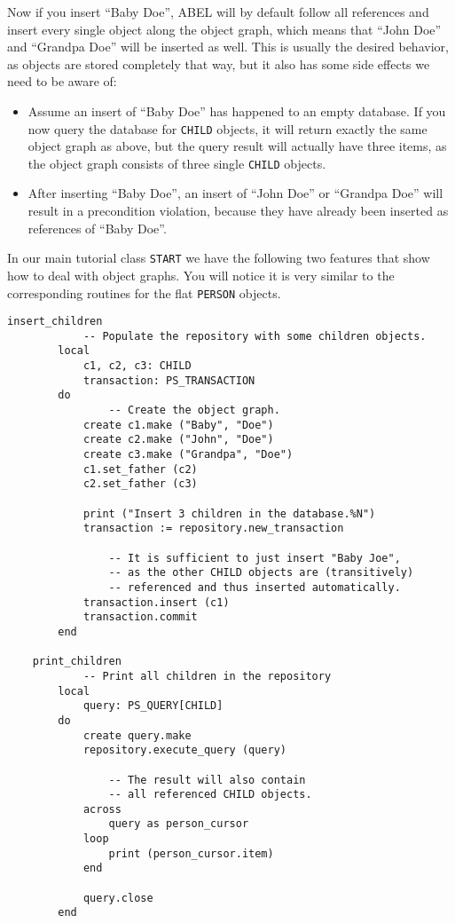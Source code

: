 \documentclass[a4paper,12pt]{report}
\begin{document}
Now if you insert ``Baby Doe'', ABEL will by default follow all references and insert every single object along the object graph, which means that ``John Doe'' and ``Grandpa Doe'' will be inserted as well.
This is usually the desired behavior, as objects are stored completely that way, but it also has some side effects we need to be aware of:

\begin{itemize}
\item Assume an insert of ``Baby Doe'' has happened to an empty database. 
If you now query the database for \lstinline!CHILD! objects, it will return exactly the same object graph as above, 
but the query result will actually have three items, as the object graph consists of three single \lstinline!CHILD! objects.
	
\item After inserting ``Baby Doe'', an insert of ``John Doe'' or ``Grandpa Doe'' will result in a precondition violation, because they have already been inserted as references of ``Baby Doe''.
\end{itemize}

In our main tutorial class \lstinline{START} we have the following two features that show how to deal with object graphs. 
You will notice it is very similar to the corresponding routines for the flat \lstinline!PERSON! objects.
\begin{lstlisting}[language=OOSC2Eiffel, captionpos=b, caption={Dealing with object graphs.}, label={lst:references_handling}]
	insert_children
			-- Populate the repository with some children objects.
		local
			c1, c2, c3: CHILD
			transaction: PS_TRANSACTION
		do
				-- Create the object graph.
			create c1.make ("Baby", "Doe")
			create c2.make ("John", "Doe")
			create c3.make ("Grandpa", "Doe")
			c1.set_father (c2)
			c2.set_father (c3)

			print ("Insert 3 children in the database.%N")
			transaction := repository.new_transaction

				-- It is sufficient to just insert "Baby Joe", 
				-- as the other CHILD objects are (transitively) 
				-- referenced and thus inserted automatically.
			transaction.insert (c1)
			transaction.commit
		end

	print_children
			-- Print all children in the repository
		local
			query: PS_QUERY[CHILD]
		do
			create query.make
			repository.execute_query (query)
			
				-- The result will also contain
				-- all referenced CHILD objects.
			across
				query as person_cursor
			loop
				print (person_cursor.item)
			end

			query.close
		end
\end{lstlisting}
\end{document}
